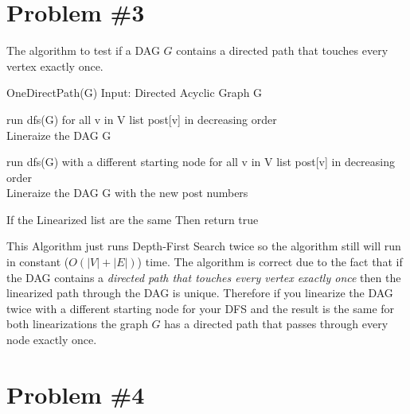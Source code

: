 \documentclass[11pt]{article}
\numberwithin{equation}{section}
\begin{document}
\section{Problem \#3}
The algorithm to test if a DAG $G$ contains a directed path that touches every vertex exactly once.
\begin{verbatimtab}[4]
OneDirectPath(G)
	Input: Directed Acyclic Graph G

	run dfs(G)
	for all v in V
		list post[v] in decreasing order \\Lineraize the DAG G
	
	run dfs(G) with a different starting node
	for all v in V
		list post[v] in decreasing order \\Lineraize the DAG G with the new post numbers 

	If the Linearized list are the same 
		Then return true
\end{verbatimtab}
This Algorithm just runs Depth-First Search twice so the algorithm still will run in constant ($O(|V|+|E|)$) time. The algorithm is correct due to the fact that if the DAG contains a \emph{directed path that touches every vertex exactly once} then the linearized path through the DAG is unique. Therefore if you linearize the DAG twice with a different starting node for your DFS and the result is the same for both linearizations the graph $G$ has a directed path that passes through every node exactly once.

\section{Problem \#4}
\end{document}
